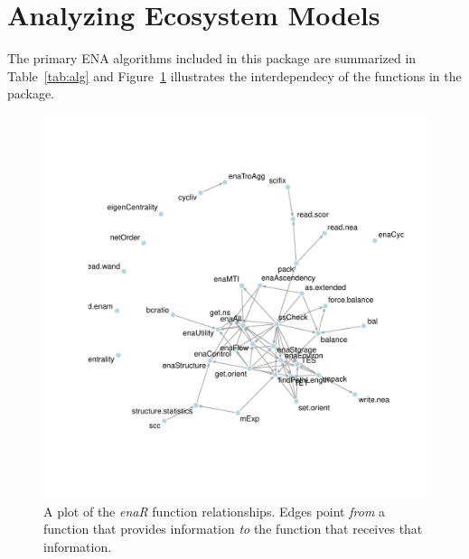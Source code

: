 \documentclass[article]{jss}
\begin{document}

\section{Analyzing Ecosystem Models}

The primary ENA algorithms included in this package are summarized in
Table~\ref{tab:alg} and Figure~\ref{fig:depnet} illustrates the
interdependecy of the functions in the package.

\begin{figure}
  \center
  \includegraphics{images/enaR-vignette-003.pdf}
  \caption{A plot of the \textit{enaR} function relationships. Edges
    point \textit{from} a function that provides information \textit{to}
    the function that receives that information.} \label{fig:depnet}
\end{figure}
\end{document}
